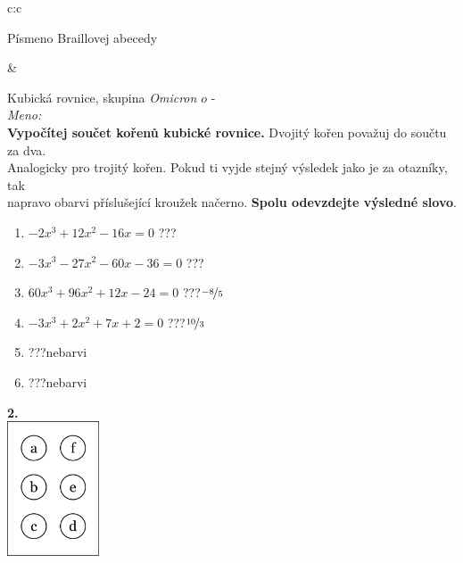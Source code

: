 \documentclass[10pt]{report}
\newcommand\omicron{o}
\begin{document}
\begin{tabular}{c:c}
\begin{minipage}[c][99mm][t]{0.49\linewidth}
\begin{center}
\begin{minipage}{0.20\linewidth}
\begin{center}
{\small Písmeno Braillovej abecedy}
\end{center}
\end{minipage}
\end{center}
\end{minipage}
&
\begin{minipage}[c][99mm][t]{0.49\linewidth}
\begin{center}
\vspace{7mm}
{\huge Kubická rovnice, skupina \textit{Omicron $\omicron$} -}\\[4.5mm]
\textit{Meno:}\phantom{xxxxxxxxxxxxxxxxxxxxxxxxxxxxxxxxxxxxxxxxxxxxxxxxxxxxxxxxxxxxxxxxx}\\[3.5mm]
\textbf{Vypočítej součet kořenů kubické rovnice.} Dvojitý kořen považuj do součtu za dva.\\Analogicky pro trojitý kořen. Pokud ti vyjde stejný výsledek jako je za otazníky, tak\\napravo obarvi příslušející kroužek načerno. \textbf{Spolu odevzdejte výsledné slovo}.\\[3mm]
\begin{minipage}{0.77\linewidth}
\begin{center}
\begin{varwidth}{\textwidth}
\begin{enumerate}
\large
\item $-2x^3+12x^2-16x=0$\quad \dotfill\; ???\;\dotfill {}
\item $-3x^3-27x^2-60x-36=0$\quad \dotfill\; ???\;\dotfill {}
\item $60x^3+96x^2+12x-24=0$\quad \dotfill\; ???\;\dotfill \quad $\nicefrac{-8}{5}$
\item $-3x^3+2x^2+7x+2=0$\quad \dotfill\; ???\;\dotfill \quad $\nicefrac{10}{3}$
\item \quad \dotfill\; ???\;\dotfill \quad nebarvi
\item \quad \dotfill\; ???\;\dotfill \quad nebarvi
\end{enumerate}
\end{varwidth}
\end{center}
\end{minipage}
\begin{minipage}{0.20\linewidth}
\begin{center}
{\Huge\bfseries 2.} \\[2mm]
\includegraphics[height=40mm]{../images/braille.png}

\end{center}
\end{minipage}
\end{center}
\end{minipage}
\end{tabular}
\end{document}

